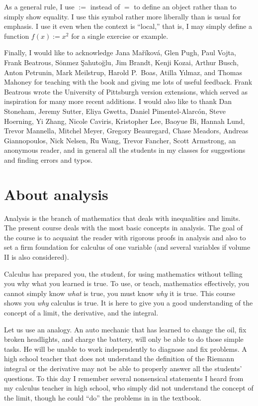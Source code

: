 As a general rule, I use $:=$ instead of $=$ to define an
object rather than to simply show equality.  I use this symbol rather more
liberally than is usual for emphasis.
I use it even when the context is ``local,''
that is, I may simply define a function $f(x) := x^2$
for a single exercise or example.

\medskip

Finally, I would like to acknowledge Jana Ma\v{r}\'ikov\'a,
Glen Pugh, Paul Vojta, Frank Beatrous, S\"{o}nmez \c{S}ahuto\u{g}lu,
Jim Brandt, Kenji Kozai, Arthur Busch,  Anton Petrunin,
Mark Meilstrup, Harold P.\ Boas, Atilla Y{\i}lmaz, and
Thomas Mahoney
for teaching with the book and giving me lots of useful feedback.
Frank Beatrous wrote the University of Pittsburgh version extensions, which
served as inspiration for many more recent additions.
I would also like to thank
Dan Stoneham, Jeremy Sutter, Eliya Gwetta, Daniel Pimentel-Alarc\'on,
Steve Hoerning, Yi Zhang, Nicole Caviris,
Kristopher Lee, Baoyue Bi, Hannah Lund,
Trevor Mannella, Mitchel Meyer, Gregory Beauregard,
Chase Meadors, Andreas Giannopoulos, Nick Nelsen,
Ru Wang, Trevor Fancher, Scott Armstrong,
an anonymous reader, and in general all the students in my classes for suggestions and
finding errors and typos.


\sectionnewpage
\section{About analysis} \label{sec:aboutra}

Analysis is the branch of mathematics that deals with inequalities and
limits.  The present course deals with the most basic 
concepts in analysis.  The goal of the course is to acquaint the reader
with rigorous proofs in analysis and also to
set a firm foundation for calculus of one variable (and several variables if
volume II is also considered).

Calculus has prepared you, the student, for using mathematics without telling
you why what you learned is true.  To use, or teach, mathematics
effectively, you cannot simply know \emph{what} is true, you must know
\emph{why} it is true.  This course shows you \emph{why} calculus
is true.  It is here to give you a good understanding of the concept of a
limit, the derivative, and the integral.

Let us use an analogy.
An auto mechanic that has learned to change the oil, fix broken headlights,
and charge the battery, will only be able to do those simple tasks.  He
will be unable to work independently to diagnose and fix problems.
A high school teacher that does not understand the definition of the Riemann
integral or the derivative may not be able to properly answer all the
students' questions.
To this day I remember several nonsensical statements I heard
from my calculus teacher in high school, who simply did not understand
the concept of the limit, though he could ``do'' the problems in in the
textbook.

